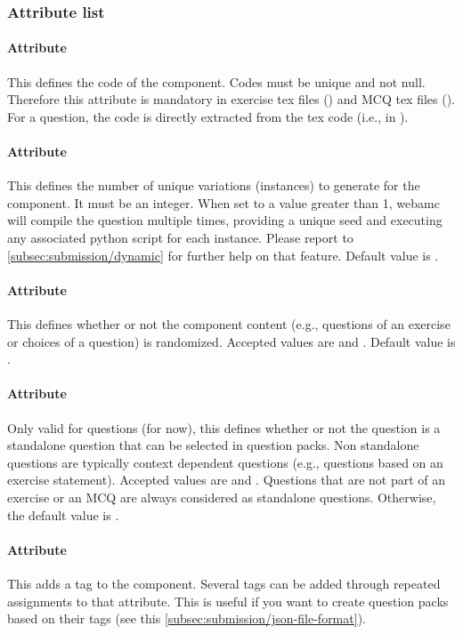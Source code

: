 \subsubsection{Attribute list}
\paragraph{Attribute }
This defines the code of the component. Codes must be unique and not
null. Therefore this attribute is mandatory in exercise tex files
() and MCQ tex files (). For a
question, the code is directly extracted from the tex code (i.e.,
 in ).
\paragraph{Attribute }
This defines the number of unique variations (instances) to generate
for the component. It must be an integer. When set to a value greater
than 1, webamc will compile the question multiple times, providing a
unique seed and executing any associated python script for each
instance. Please report to \cref{subsec:submission/dynamic} for
further help on that feature. Default value is .
\paragraph{Attribute }
This defines whether or not the component content (e.g., questions of
an exercise or choices of a question) is randomized. Accepted values
are  and . Default value is
.
\paragraph{Attribute }
Only valid for questions (for now), this defines whether or not the
question is a standalone question that can be selected in question
packs. Non standalone questions are typically context dependent
questions (e.g., questions based on an exercise statement).  Accepted
values are  and . Questions that are
not part of an exercise or an MCQ are always considered as standalone
questions. Otherwise, the default value is .
\paragraph{Attribute }
This adds a tag to the component. Several tags can be added through
repeated assignments to that attribute. This is useful if you want to
create question packs based on their tags (see this
\cref{subsec:submission/json-file-format}).
